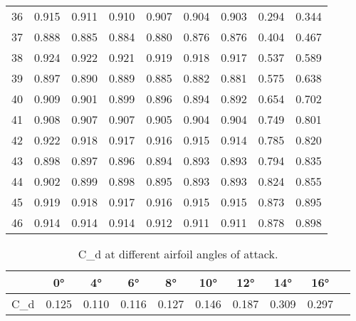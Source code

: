 \begin{table}[htpb]
\begin{tabular}{ccccccccc}
        \num{36} & \num{0.915} & \num{0.911} & \num{0.910} & \num{0.907} & \num{0.904} & \num{0.903} & \num{0.294} & \num{0.344} \\
        \num{37} & \num{0.888} & \num{0.885} & \num{0.884} & \num{0.880} & \num{0.876} & \num{0.876} & \num{0.404} & \num{0.467} \\
        \num{38} & \num{0.924} & \num{0.922} & \num{0.921} & \num{0.919} & \num{0.918} & \num{0.917} & \num{0.537} & \num{0.589} \\
        \num{39} & \num{0.897} & \num{0.890} & \num{0.889} & \num{0.885} & \num{0.882} & \num{0.881} & \num{0.575} & \num{0.638} \\
        \num{40} & \num{0.909} & \num{0.901} & \num{0.899} & \num{0.896} & \num{0.894} & \num{0.892} & \num{0.654} & \num{0.702} \\
        \num{41} & \num{0.908} & \num{0.907} & \num{0.907} & \num{0.905} & \num{0.904} & \num{0.904} & \num{0.749} & \num{0.801} \\
        \num{42} & \num{0.922} & \num{0.918} & \num{0.917} & \num{0.916} & \num{0.915} & \num{0.914} & \num{0.785} & \num{0.820} \\
        \num{43} & \num{0.898} & \num{0.897} & \num{0.896} & \num{0.894} & \num{0.893} & \num{0.893} & \num{0.794} & \num{0.835} \\
        \num{44} & \num{0.902} & \num{0.899} & \num{0.898} & \num{0.895} & \num{0.893} & \num{0.893} & \num{0.824} & \num{0.855} \\
        \num{45} & \num{0.919} & \num{0.918} & \num{0.917} & \num{0.916} & \num{0.915} & \num{0.915} & \num{0.873} & \num{0.895} \\
        \num{46} & \num{0.914} & \num{0.914} & \num{0.914} & \num{0.912} & \num{0.911} & \num{0.911} & \num{0.878} & \num{0.898} \\
        \bottomrule
    \end{tabular}
\end{table}

\begin{table}[htpb]
    \caption{\gls{C_d} at different airfoil angles of attack.}
    \label{tab:CD_data}
    \centering
    \begin{tabular}{cccccccccc}
        \toprule
        & \num{0}\unit{\degree} & \num{4}\unit{\degree} & \num{6}\unit{\degree} & \num{8}\unit{\degree} & \num{10}\unit{\degree} & \num{12}\unit{\degree} & \num{14}\unit{\degree} & \num{16}\unit{\degree}\\
        \midrule
        \gls{C_d} & \num{0.125} & \num{0.110} & \num{0.116} & \num{0.127} & \num{0.146} & \num{0.187} & \num{0.309} & \num{0.297} \\
        \bottomrule
    \end{tabular}
\end{table}